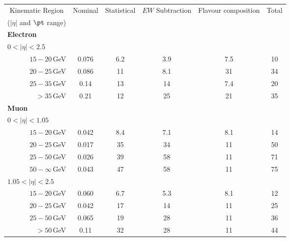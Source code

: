 \begin{tabular}{c|c|c|c|c|c}
    \toprule
    Kinematic Region                        & Nominal & Statistical & $EW$ Subtraction & Flavour composition & Total \\
    ($|\eta|$ and $\pt$ range)              &       &             &                &                    &       \\
    \midrule
    \multicolumn{1}{l|}{\textbf{Electron}} &       &             &                &                    &       \\
    \multicolumn{1}{l|}{$0<|\eta|<2.5$}   &       &             &                &                    &       \\
    \multicolumn{1}{r|}{$15-20$\,GeV}    & 0.076 & 6.2         & 3.9            & 7.5                & 10    \\
    \multicolumn{1}{r|}{$20-25$\,GeV}    & 0.086 & 11          & 8.1            & 31                 & 34    \\
    \multicolumn{1}{r|}{$25-35$\,GeV}    & 0.14  & 13          & 14             & 7.4                & 20    \\
    \multicolumn{1}{r|}{$> 35$\,GeV} & 0.21  & 12          & 25             & 21                 & 35    \\
    \midrule
    \multicolumn{1}{l|}{\textbf{Muon}}     &       &             &                &                    &       \\
    \multicolumn{1}{l|}{$0<|\eta|<1.05$}  &       &             &                &                    &       \\
    \multicolumn{1}{r|}{$15-20$\,GeV}    & 0.042 & 8.4         & 7.1            & 8.1                & 14    \\
    \multicolumn{1}{r|}{$20-25$\,GeV}    & 0.017 & 35          & 34             & 11                 & 50    \\
    \multicolumn{1}{r|}{$25-50$\,GeV}    & 0.026 & 39          & 58             & 11                 & 71    \\
    \multicolumn{1}{r|}{$50-\infty$\,GeV}  & 0.043 & 47          & 58             & 11                 & 75    \\
    \multicolumn{1}{l|}{$1.05<|\eta|<2.5$}  &       &             &                &                    &       \\
    \multicolumn{1}{r|}{$15-20$\,GeV}    & 0.060 & 6.7         & 5.3            & 8.1                & 12    \\
    \multicolumn{1}{r|}{$20-25$\,GeV}    & 0.042 & 17          & 14             & 11                 & 25    \\
    \multicolumn{1}{r|}{$25-50$\,GeV}    & 0.065 & 19          & 28             & 11                 & 36    \\
    \multicolumn{1}{r|}{$> 50$\,GeV}  & 0.11  & 32          & 28             & 11                 & 44    \\
    \bottomrule
    \end{tabular}
    